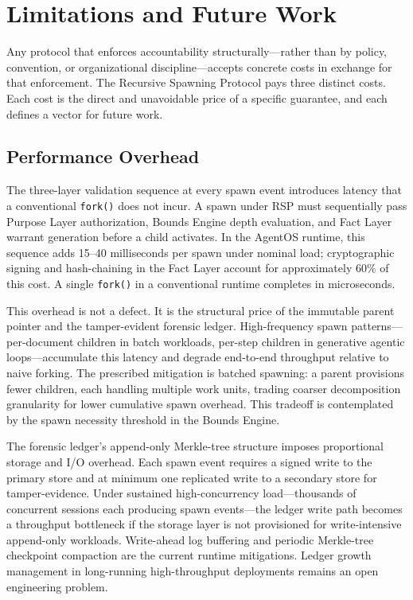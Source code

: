 \section{Limitations and Future Work}
\label{sec:rs-limitations}

Any protocol that enforces accountability structurally—rather than by policy, convention, or organizational discipline—accepts concrete costs in exchange for that enforcement. The Recursive Spawning Protocol pays three distinct costs. Each cost is the direct and unavoidable price of a specific guarantee, and each defines a vector for future work.

\subsection{Performance Overhead}
\label{sec:rs-perf-overhead}

The three-layer validation sequence at every spawn event introduces latency that a conventional \texttt{fork()} does not incur. A spawn under RSP must sequentially pass Purpose Layer authorization, Bounds Engine depth evaluation, and Fact Layer warrant generation before a child activates. In the AgentOS runtime, this sequence adds \numrange{15}{40} milliseconds per spawn under nominal load; cryptographic signing and hash-chaining in the Fact Layer account for approximately 60\% of this cost. A single \texttt{fork()} in a conventional runtime completes in microseconds.

This overhead is not a defect. It is the structural price of the immutable parent pointer and the tamper-evident forensic ledger. High-frequency spawn patterns—per-document children in batch workloads, per-step children in generative agentic loops—accumulate this latency and degrade end-to-end throughput relative to naive forking. The prescribed mitigation is batched spawning: a parent provisions fewer children, each handling multiple work units, trading coarser decomposition granularity for lower cumulative spawn overhead. This tradeoff is contemplated by the spawn necessity threshold in the Bounds Engine.

The forensic ledger's append-only Merkle-tree structure imposes proportional storage and I/O overhead. Each spawn event requires a signed write to the primary store and at minimum one replicated write to a secondary store for tamper-evidence. Under sustained high-concurrency load—thousands of concurrent sessions each producing spawn events—the ledger write path becomes a throughput bottleneck if the storage layer is not provisioned for write-intensive append-only workloads. Write-ahead log buffering and periodic Merkle-tree checkpoint compaction are the current runtime mitigations. Ledger growth management in long-running high-throughput deployments remains an open engineering problem.

